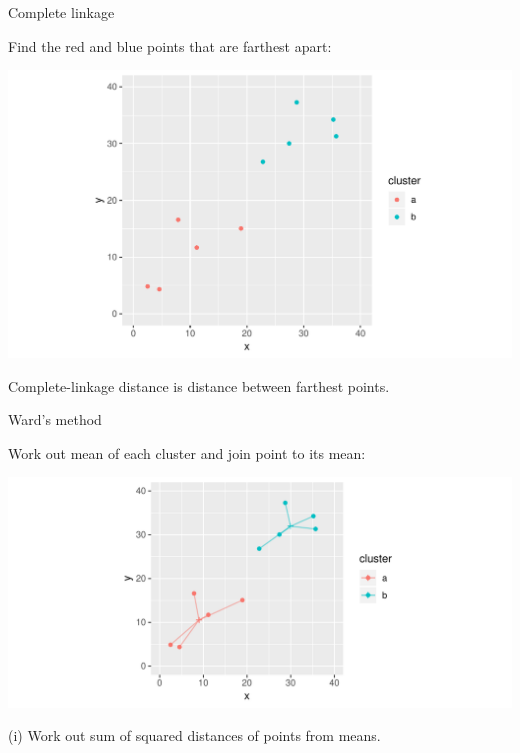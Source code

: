\documentclass[unknownkeysallowed]{beamer}\usepackage[]{graphicx}\usepackage[]{color}
\makeatletter
\def\maxwidth{ %
  \ifdim\Gin@nat@width>\linewidth
    \linewidth
  \else
    \Gin@nat@width
  \fi
}
\newenvironment{knitrout}{}{} %
\makeatother
\begin{document}
\begin{frame}[fragile]{Complete linkage}
  
  Find the red and blue points that are farthest apart:
  
\begin{knitrout}
\color{fgcolor}
\includegraphics[width=\maxwidth]{figure/unnamed-chunk-319-1} 

\end{knitrout}

Complete-linkage distance is distance between farthest points. 
  
\end{frame}

\begin{frame}[fragile]{Ward's method}
  
  Work out mean of each cluster and join point to its mean:
  
\begin{knitrout}
\color{fgcolor}
\includegraphics[width=\maxwidth]{figure/unnamed-chunk-320-1} 

\end{knitrout}

(i) Work out sum of squared distances of points from means.
\end{frame}
\end{document}
